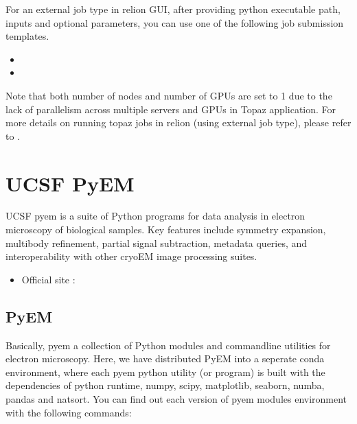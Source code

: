 \documentclass[a4paper,11pt,english]{sphinxmanual}
\begin{document}
\sphinxAtStartPar
For an external job type in relion GUI, after providing python executable path, inputs and optional parameters, you can use one of the following job submission templates.
\begin{itemize}
\item {} 
\sphinxAtStartPar
{}

\item {} 
\sphinxAtStartPar
{}

\end{itemize}



\sphinxAtStartPar
Note that both number of nodes and number of GPUs are set to 1 due to the lack of parallelism across multiple servers and GPUs in Topaz application.
For more details on running topaz jobs in relion (using external job type), please refer to .

\sphinxstepscope


\chapter{UCSF PyEM}
\label{\detokenize{pyem:ucsf-pyem}}\label{\detokenize{pyem:pyem}}\label{\detokenize{pyem::doc}}
\sphinxAtStartPar
UCSF pyem is a suite of Python programs for data analysis in electron microscopy of biological samples.
Key features include symmetry expansion, multi\sphinxhyphen{}body refinement, partial signal subtraction, metadata queries, and interoperability with other cryo\sphinxhyphen{}EM image processing suites.
\begin{itemize}
\item {} 
\sphinxAtStartPar
Official  site : 

\end{itemize}


\section{PyEM}
\label{\detokenize{pyem:id1}}
\sphinxAtStartPar
Basically, pyem a collection of Python modules and command\sphinxhyphen{}line utilities for electron microscopy. Here, we have distributed PyEM into a seperate conda environment,
where each pyem python utility (or program) is built with the dependencies of python runtime, numpy, scipy, matplotlib, seaborn, numba, pandas and natsort.
You can find out each version of pyem modules environment with the following commands:
\end{document}
